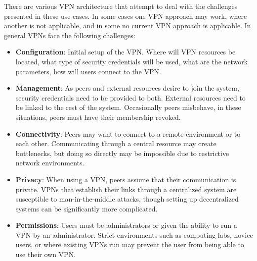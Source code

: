 There are various VPN architecture that attempt to deal with the challenges
presented in these use cases.  In some cases one VPN approach may work,
where another is not applicable, and in some no current VPN approach is
applicable.  In general VPNs face the following challenges:  
\begin{itemize}
\item \textbf{Configuration}:  Initial setup of the VPN.  Where will VPN
resources be located, what type of security credentials will be used, what are
the network parameters, how will users connect to the VPN.
\item \textbf{Management}:  As peers and external resources desire to join the
system, security credentials need to be provided to both.  External resources
need to be linked to the rest of the system.  Occasionally peers misbehave, in
these situations, peers must have their membership revoked.
\item \textbf{Connectivity}:  Peers may want to connect to a remote environment
or to each other.  Communicating through a central resource may create
bottlenecks, but doing so directly may be impossible due to restrictive network
environments.
\item \textbf{Privacy}:  When using a VPN, peers assume that their communication
is private.  VPNs that establish their links through a centralized system are
susceptible to man-in-the-middle attacks, though setting up decentralized
systems can be significantly more complicated.
\item \textbf{Permissions}:  Users must be administrators or given the ability
to run a VPN by an administrator.  Strict environments such as computing labs,
novice users, or where existing VPNs run may prevent the user from being able
to use their own VPN.
\end{itemize}

